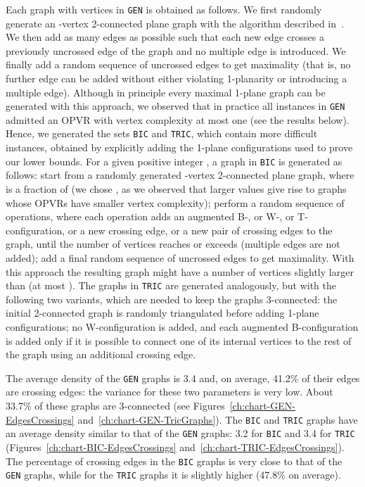 \documentclass{article}
\newcommand{\opvr}{OPVR\xspace}
\begin{document}
Each graph with  vertices in {\tt GEN} is obtained as follows. We first randomly generate an -vertex 2-connected plane graph with the algorithm described in~\cite{DBLP:journals/tc/BertolazziBD00}. We then add as many edges as possible such that each new edge crosses a previously uncrossed edge of the graph and no multiple edge is introduced. We finally add a random sequence of uncrossed edges to get maximality (that is, no further edge can be added without either violating 1-planarity or introducing a multiple edge). Although in principle every maximal 1-plane graph can be generated with this approach, we observed that in practice all instances in {\tt GEN} admitted an \opvr with vertex complexity at most one (see the results below). Hence, we generated the sets {\tt BIC} and {\tt TRIC}, which contain more difficult instances, obtained by explicitly adding the 1-plane configurations used to prove our lower bounds. For a given positive integer , a graph in {\tt BIC} is generated as follows:  start from a randomly generated -vertex 2-connected plane graph, where  is a fraction of  (we chose , as we observed that larger values give rise to graphs whose {\opvr}s have smaller vertex complexity);  perform a random sequence of operations, where each operation adds an augmented B-, or W-, or T-configuration, or a new crossing edge, or a new pair of crossing edges to the graph, until the number of vertices reaches or exceeds  (multiple edges are not added);  add a final random sequence of uncrossed edges to get maximality. With this approach the resulting graph might have a number of vertices slightly larger than  (at most ). The graphs in {\tt TRIC} are generated analogously, but with the following two variants, which are needed to keep the graphs 3-connected:  the initial 2-connected graph is randomly triangulated before adding 1-plane configurations;  no W-configuration is added, and each augmented B-configuration is added only if it is possible to connect one of its internal vertices to the rest of the graph using an additional crossing edge. 

The average density of the {\tt GEN} graphs is 3.4 and, on average, 41.2\% of their edges are crossing edges: the variance for these two parameters is very low. About 33.7\% of these graphs are 3-connected (see Figures~\ref{ch:chart-GEN-EdgesCrossings} and~\ref{ch:chart-GEN-TricGraphs}). The {\tt BIC} and {\tt TRIC} graphs have an average density similar to that of the {\tt GEN} graphs: 3.2 for {\tt BIC} and 3.4 for {\tt TRIC} (Figures~\ref{ch:chart-BIC-EdgesCrossings} and~\ref{ch:chart-TRIC-EdgesCrossings}). The percentage of crossing edges in the {\tt BIC} graphs is very close to that of the {\tt GEN} graphs, while for the {\tt TRIC} graphs it is slightly higher (47.8\% on  average).
 
\end{document}
